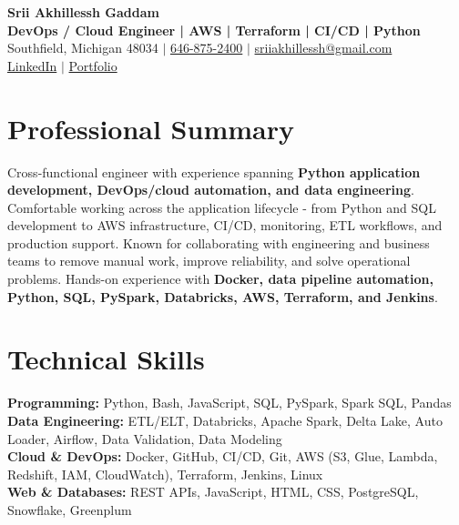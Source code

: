 \documentclass[letterpaper,10pt]{article}
\begin{document}
\fontsize{9.35pt}{10.45pt}\selectfont

\begin{center}
    {\LARGE \textbf{Srii Akhillessh Gaddam}} \\[-1pt]
    \textbf{DevOps / Cloud Engineer | AWS | Terraform | CI/CD | Python} \\[2pt]
    Southfield, Michigan 48034 $|$
    \href{tel:6468752400}{646-875-2400} $|$
    \href{mailto:sriiakhillessh@gmail.com}{sriiakhillessh@gmail.com} \\[1pt]
    \href{https://www.linkedin.com/in/srii-akhiilessh-gaddam-b48668191/}{LinkedIn} $|$
    \href{https://sriiakhillesshg.github.io/portfolio/}{Portfolio}
\end{center}
\vspace{-8pt}

\section{Professional Summary}
\small{Cross-functional engineer with experience spanning \textbf{Python application development, DevOps/cloud automation, and data engineering}. Comfortable working across the application lifecycle - from Python and SQL development to AWS infrastructure, CI/CD, monitoring, ETL workflows, and production support. Known for collaborating with engineering and business teams to remove manual work, improve reliability, and solve operational problems. Hands-on experience with \textbf{Docker, data pipeline automation, Python, SQL, PySpark, Databricks, AWS, Terraform, and Jenkins}.}

\section{Technical Skills}
\small{
\textbf{Programming:} Python, Bash, JavaScript, SQL, PySpark, Spark SQL, Pandas \\
\textbf{Data Engineering:} ETL/ELT, Databricks, Apache Spark, Delta Lake, Auto Loader, Airflow, Data Validation, Data Modeling \\
\textbf{Cloud \& DevOps:} Docker, GitHub, CI/CD, Git, AWS (S3, Glue, Lambda, Redshift, IAM, CloudWatch), Terraform, Jenkins, Linux \\
\textbf{Web \& Databases:} REST APIs, JavaScript, HTML, CSS, PostgreSQL, Snowflake, Greenplum
}
\end{document}
